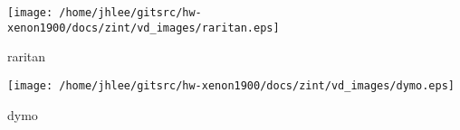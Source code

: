 \noindent
\vspace{1.4cm}
\begin{minipage}{.2\textwidth}
\begin{center}
\texttt{[image: /home/jhlee/gitsrc/hw-xenon1900/docs/zint/vd\_images/raritan.eps]}
\end{center}
\end{minipage}
\begin{minipage}{.7\textwidth}
raritan
\end{minipage}


\noindent
\vspace{1.4cm}
\begin{minipage}{.2\textwidth}
\begin{center}
\texttt{[image: /home/jhlee/gitsrc/hw-xenon1900/docs/zint/vd\_images/dymo.eps]}
\end{center}
\end{minipage}
\begin{minipage}{.7\textwidth}
dymo
\end{minipage}


